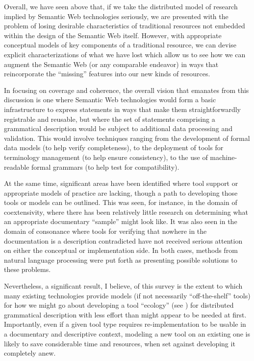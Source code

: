 Overall, we have seen above that, if we take the distributed model of research
implied by Semantic Web technologies seriously, we are presented with the
problem of losing desirable characteristics of traditional resources not
embedded within the design of the Semantic Web itself. However, with appropriate
conceptual models of key components of a traditional resource, we can devise
explicit characterizations of what we have lost which allow us to see how we can
augment the Semantic Web (or any comparable endeavor) in ways that reincorporate
the ``missing'' features into our new kinds of resources.

In focusing on coverage and coherence, the overall vision that emanates from
this discussion is one where Semantic Web technologies would form a basic
infrastructure to express statements in ways that make them straightforwardly
registrable and reusable, but where the set of statements comprising a
grammatical description would be subject to additional data processing and
validation. This would involve techniques ranging from the development of formal
data models (to help verify completeness), to the deployment of tools for
terminology management (to help ensure consistency), to the use of
machine-readable formal grammars (to help test for compatibility).

At the same time, significant areas have been identified where tool support or
appropriate models of practice are lacking, though a path to developing those
tools or models can be outlined. This was seen, for instance, in the domain of
coextensivity, where there has been relatively little research on determining
what an appropriate documentary ``sample'' might look like. It was also seen in
the domain of consonance where tools for verifying that nowhere in the
documentation is a description contradicted have not received serious attention on
either the conceptual or implementation side. In both cases, methods from
natural language processing were put forth as presenting possible solutions to
these problems.

Nevertheless, a significant result, I believe, of this survey is the extent to
which many existing technologies provide models (if not necessarily
``off-the-shelf'' tools) for how we might go about developing a tool ``ecology''
(see ) for distributed grammatical description with
less effort than might appear to be needed at first. Importantly, even if a
given tool type requires re-implementation to be usable in a documentary and
descriptive context, modeling a new tool on an existing one is likely to save
considerable time and resources, when set against developing it completely anew.



